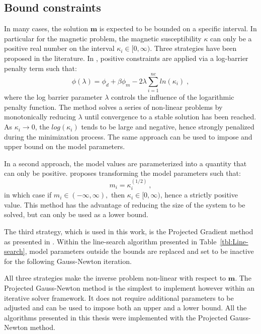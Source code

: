 \subsection{Bound constraints}
In many cases, the solution $\mathbf{m}$ is expected to be bounded on a specific interval.
In particular for the magnetic problem, the magnetic susceptibility $\kappa$ can only be a positive real number on the interval $\kappa_i \in [0,\infty)$.
Three strategies have been proposed in the literature.
In \cite{LiOldenburg03}, positive constraints are applied via a log-barrier penalty term such that:
\begin{equation}
\phi(\lambda) = \phi_d + \beta \phi_m - 2\lambda \sum_{i=1}^{nc} ln(\kappa_i) \; ,
\end{equation}
where the log barrier parameter $\lambda$ controls the influence of the logarithmic penalty function.
The method solves a series of non-linear problems by monotonically reducing $\lambda$ until convergence to a stable solution has been reached.
As $\kappa_i \rightarrow 0$, the $log(\kappa_i)$ tends to be large and negative, hence strongly penalized during the minimization process. 
The same approach can be used to impose and upper bound on the model parameters.

In a second approach, the model values are parameterized into a quantity that can only be positive.
\cite{LelievreMSc} proposes transforming the model parameters such that:
\begin{equation}
m_i = \kappa_i^{(1/2)}\:,
\end{equation}
in which case if $m_i \in (-\infty,\infty),$ then $\kappa_i \in [0,\infty)$, hence a strictly positive value. 
This method has the advantage of reducing the size of the system to be solved, but can only be used as a lower bound.

The third strategy, which is used in this work, is the Projected Gradient method as presented in \cite{Vogel02}.
Within the line-search algorithm presented in Table~\ref{tbl:Line-search}, model parameters outside the bounds are replaced and set to be inactive for the following Gauss-Newton iteration. 

All three strategies make the inverse problem non-linear with respect to $\mathbf{m}$. The Projected Gauss-Newton method is the simplest to implement however within an iterative solver framework.
It does not require additional parameters to be adjusted and can be used to impose both an upper and a lower bound. All the algorithms presented in this thesis were implemented with the Projected Gauss-Newton method.

